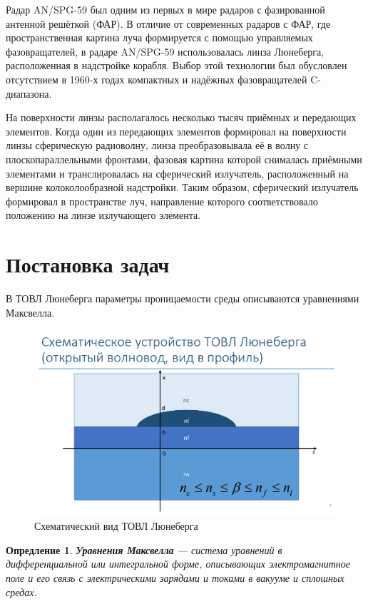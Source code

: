 \documentclass{article}
\newtheorem{definition}{Опредление}
\begin{document}
Радар AN/SPG-59 был одним из первых в мире радаров с фазированной антенной решёткой (ФАР). В отличие от современных радаров с ФАР, где пространственная картина луча формируется с помощью управляемых фазовращателей, в радаре AN/SPG-59 использовалась линза Люнеберга, расположенная в надстройке корабля. Выбор этой технологии был обусловлен отсутствием в 1960-х годах компактных и надёжных фазовращателей C-диапазона.

На поверхности линзы располагалось несколько тысяч приёмных и передающих элементов. Когда один из передающих элементов формировал на поверхности линзы сферическую радиоволну, линза преобразовывала её в волну с плоскопараллельными фронтами, фазовая картина которой снималась приёмными элементами и транслировалась на сферический излучатель, расположенный на вершине колоколообразной надстройки. Таким образом, сферический излучатель формировал в пространстве луч, направление которого соответствовало положению на линзе излучающего элемента.

\newpage

\section{Постановка задач}
В ТОВЛ Люнеберга параметры проницаемости среды описываются уравнениями Максвелла.

\begin{figure}[H]
    \centering
    \includegraphics[width=\linewidth]{image2.png}
    \caption{Схематический вид ТОВЛ Люнеберга}
    \label{luneberg}
\end{figure}

\begin{definition}
{\bf Уравнения Максвелла} — система уравнений в дифференциальной или интегральной форме, описывающих электромагнитное поле и его связь с электрическими зарядами и токами в вакууме и сплошных средах.
\end{definition}
\end{document}
